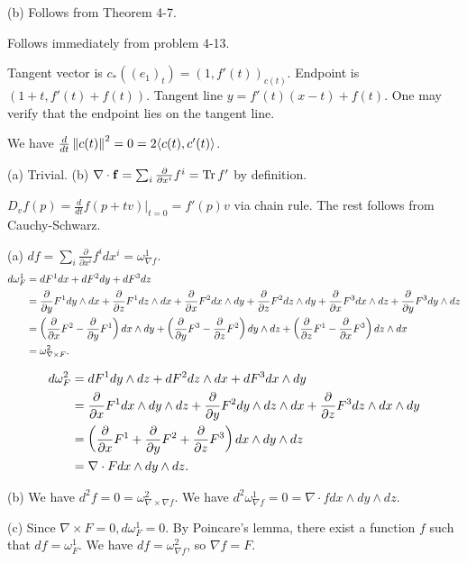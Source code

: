 \documentclass[11pt]{scrartcl}
\begin{document}
(b) Follows from Theorem 4-7.

\begin{problem*}[4-14]
\end{problem*}
Follows immediately from problem 4-13.

\begin{problem*}[4-15]
\end{problem*}
Tangent vector is $c_*((e_1)_t) = (1, f'(t))_{c(t)}$.
Endpoint is $(1 + t, f'(t) + f(t))$.
Tangent line $y = f'(t)(x - t) + f(t)$.
One may verify that the endpoint lies on the tangent line.

\begin{problem*}[4-16]
\end{problem*}
We have $\frac{d}{dt}\left\lVert c(t) \right\rVert^2 = 0 = 2\langle c(t), c'(t) \rangle$.

\begin{problem*}[4-17]
\end{problem*}
(a) Trivial.
(b) $\nabla\cdot \mathbf{f} = \sum_i\frac{\partial}{\partial x^i}f^i = \operatorname{Tr}{f'}$ by definition.

\begin{problem*}[4-18]
\end{problem*}
$D_vf(p) = \frac{d}{dt}f(p + tv)|_{t = 0} = f'(p)v$ via chain rule.
The rest follows from Cauchy-Schwarz.

\begin{problem*}[4-19]
\end{problem*}
(a)
$df = \sum_i\frac{\partial}{\partial x^i}f^idx^i = \omega^1_{\nabla f}$.
\begin{align*}
    d\omega^1_F 
    &=
    dF^1 dx + dF^2 dy + dF^3 dz \\
    &=
    \frac{\partial}{\partial y}F^1 dy\wedge dx + \frac{\partial}{\partial z}F^1 dz\wedge dx + \frac{\partial}{\partial x}F^2 dx\wedge dy + \frac{\partial}{\partial z}F^2 dz\wedge dy + \frac{\partial}{\partial x}F^3 dx\wedge dz + \frac{\partial}{\partial y}F^3 dy\wedge dz \\
    &=
    \left(\frac{\partial}{\partial x}F^2 - \frac{\partial}{\partial y}F^1\right)dx\wedge dy + \left(\frac{\partial}{\partial y}F^3 - \frac{\partial}{\partial z}F^2\right)dy\wedge dz + \left(\frac{\partial}{\partial z}F^1 - \frac{\partial}{\partial x}F^3\right)dz\wedge dx \\
    &=
    \omega^2_{\nabla \times F}.
\end{align*}

\begin{align*}
    d\omega^2_F 
    &= 
    dF^1 dy\wedge dz + dF^2 dz\wedge dx + dF^3 dx\wedge dy \\
    &=
    \frac{\partial}{\partial x}F^1 dx\wedge dy\wedge dz + \frac{\partial}{\partial y}F^2 dy\wedge dz\wedge dx + \frac{\partial}{\partial z}F^3 dz\wedge dx\wedge dy \\
    &=
    \left(\frac{\partial}{\partial x}F^1 + \frac{\partial}{\partial y}F^2 + \frac{\partial}{\partial z}F^3\right)dx\wedge dy\wedge dz \\
    &=
    \nabla\cdot F dx\wedge dy\wedge dz.
\end{align*}

(b) We have $d^2f = 0 = \omega^2_{\nabla\times\nabla f}$.
We have $d^2\omega^1_{\nabla f} = 0 = \nabla\cdot f dx\wedge dy\wedge dz$.

(c) Since $\nabla\times F = 0, d\omega^1_F = 0$.
By Poincare's lemma, there exist a function $f$ such that $df = \omega^1_F$.
We have $df = \omega^2_{\nabla f}$, so $\nabla f = F$.
\end{document}
